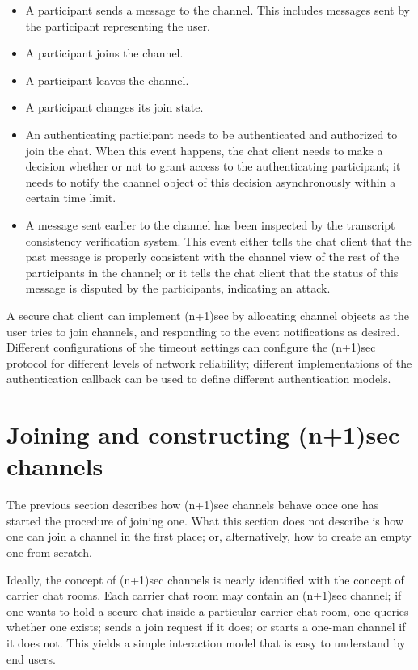 \documentclass{article}
\begin{document}
\begin{itemize}
\item A participant sends a message to the channel. This includes messages sent by the participant representing the user.
\item A participant joins the channel.
\item A participant leaves the channel.
\item A participant changes its join state.
\item An authenticating participant needs to be authenticated and authorized to join the chat. When this event happens, the chat client needs to make a decision whether or not to grant access to the authenticating participant; it needs to notify the channel object of this decision asynchronously within a certain time limit.
\item A message sent earlier to the channel has been inspected by the transcript consistency verification system. This event either tells the chat client that the past message is properly consistent with the channel view of the rest of the participants in the channel; or it tells the chat client that the status of this message is disputed by the participants, indicating an attack.
\end{itemize}

A secure chat client can implement (n+1)sec by allocating channel objects as the user tries to join channels, and responding to the event notifications as desired.
Different configurations of the timeout settings can configure the (n+1)sec protocol for different levels of network reliability; different implementations of the authentication callback can be used to define different authentication models.

\section{Joining and constructing (n+1)sec channels}
\label{sec:joining-and-constructing-np1sec-channels}

The previous section describes how (n+1)sec channels behave once one has started the procedure of joining one.
What this section does not describe is how one can join a channel in the first place; or, alternatively, how to create an empty one from scratch.

Ideally, the concept of (n+1)sec channels is nearly identified with the concept of carrier chat rooms.
Each carrier chat room may contain an (n+1)sec channel; if one wants to hold a secure chat inside a particular carrier chat room, one queries whether one exists; sends a join request if it does; or starts a one-man channel if it does not.
This yields a simple interaction model that is easy to understand by end users.
\end{document}
